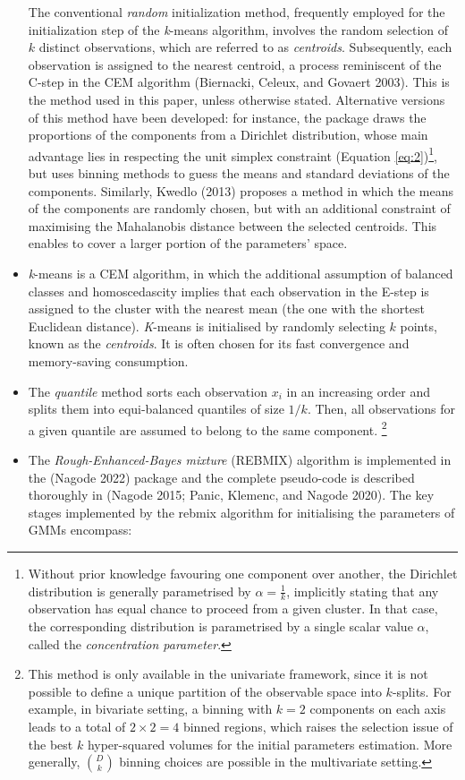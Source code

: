 \begin{itemize}
  The conventional \emph{random} initialization method, frequently employed for the initialization step of the \emph{k}-means algorithm, involves the random selection of \(k\) distinct observations, which are referred to as \emph{centroids}. Subsequently, each observation is assigned to the nearest centroid, a process reminiscent of the C-step in the CEM algorithm (Biernacki, Celeux, and Govaert 2003). This is the method used in this paper, unless otherwise stated. Alternative versions of this method have been developed: for instance, the package  draws the proportions of the components from a Dirichlet distribution, whose main advantage lies in respecting the unit simplex constraint (Equation \eqref{eq:2})\footnote{Without prior knowledge favouring one component over another, the Dirichlet distribution is generally parametrised by \(\alpha=\frac{1}{k}\), implicitly stating that any observation has equal chance to proceed from a given cluster. In that case, the corresponding distribution is parametrised by a single scalar value \(\alpha\), called the \emph{concentration parameter}.}, but uses binning methods to guess the means and standard deviations of the components. Similarly, Kwedlo (2013) proposes a method in which the means of the components are randomly chosen, but with an additional constraint of maximising the Mahalanobis distance between the selected centroids. This enables to cover a larger portion of the parameters' space.
\item
  \emph{k}-means is a CEM algorithm, in which the additional assumption of
  balanced classes and homoscedascity implies that each observation in
  the E-step is assigned to the cluster with the nearest mean (the one
  with the shortest Euclidean distance). \emph{K}-means is initialised by randomly selecting \(k\) points, known as the \emph{centroids}. It is often chosen for its fast convergence and memory-saving consumption.
\item
  The \emph{quantile} method sorts each observation \(x_i\) in an increasing
  order and splits them into equi-balanced quantiles of size \(1/k\). Then, all
  observations for a given quantile are assumed to belong to the same
  component. \footnote{This method is only available in the univariate framework,
  since it is not possible to define a unique partition of the observable space into $k$-splits. For example, in bivariate setting, a binning with $k=2$ components on each axis leads to a total of $2 \times 2=4$ binned regions, which raises the selection issue of the best $k$ hyper-squared volumes for the initial parameters estimation. More generally, $\binom{D}{k}$ binning choices are possible in the multivariate setting.}
\item
  The \emph{Rough-Enhanced-Bayes mixture} (REBMIX) algorithm is implemented in the  (Nagode 2022) package and the complete
  pseudo-code is described thoroughly in (Nagode 2015; Panic, Klemenc, and Nagode 2020). The key stages implemented by the rebmix algorithm for initialising the parameters of GMMs encompass:


\end{itemize}
